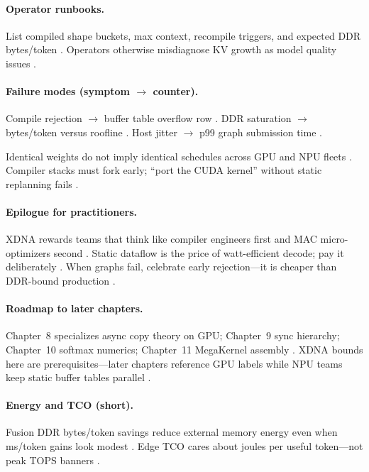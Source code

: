 \paragraph{Operator runbooks.}
List compiled shape buckets, max context, recompile triggers, and expected DDR bytes/token \citep{patel2025llminference,amd2024xdna}.
Operators otherwise misdiagnose KV growth as model quality issues \citep{kwon2023vllm,memoryfloor2026}.

\paragraph{Failure modes (symptom $\rightarrow$ counter).}
Compile rejection $\rightarrow$ buffer table overflow row \citep{yirage2026,amd2024aie}.
DDR saturation $\rightarrow$ bytes/token versus roofline \citep{memoryfloor2026}.
Host jitter $\rightarrow$ p99 graph submission time \citep{patel2025llminference,taxbreak2026}.

Identical weights do not imply identical schedules across GPU and NPU fleets \citep{liu2024deepseekv3,patel2025llminference}.
Compiler stacks must fork early; ``port the CUDA kernel'' without static replanning fails \citep{yirage2026,taxbreak2026}.

\paragraph{Epilogue for practitioners.}
XDNA rewards teams that think like compiler engineers first and MAC micro-optimizers second \citep{amd2024xdna,amd2024aie,yirage2026,chen2020compilerbasedhardw}.
Static dataflow is the price of watt-efficient decode; pay it deliberately \citep{memoryfloor2026,patel2025llminference}.
When graphs fail, celebrate early rejection---it is cheaper than DDR-bound production \citep{yirage2026,amd2024aie}.

\paragraph{Roadmap to later chapters.}
Chapter~8 specializes async copy theory on GPU; Chapter~9 sync hierarchy; Chapter~10 softmax numerics; Chapter~11 MegaKernel assembly \citep{dao2022flashattention,dao2023flashdecoding,taxbreak2026,yirage2026}.
XDNA bounds here are prerequisites---later chapters reference GPU labels while NPU teams keep static buffer tables parallel \citep{amd2024xdna,semianalysis2024tma,nvidia2022hopper}.

\paragraph{Energy and TCO (short).}
Fusion DDR bytes/token savings reduce external memory energy even when ms/token gains look modest \citep{memoryfloor2026,patel2025llminference,taxbreak2026,amd2024xdna}.
Edge TCO cares about joules per useful token---not peak TOPS banners \citep{taxbreak2026,dlbook}.

